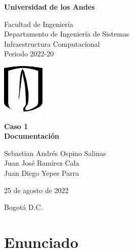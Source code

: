 \documentclass[letterpaper, 11pt]{article}
\begin{document}
\begin{titlepage}
\centering
{\bfseries\LARGE Universidad de los Andes \par}
\vspace{1cm}
{\Large Facultad de Ingeniería \\ Departamento de Ingeniería de Sistemas \\ Infraestructura Computacional \\ Periodo 2022-20\par}
\vspace{2.0cm}
{\includegraphics[width=0.15\textwidth]{imagenes/Uniandes.png}\par}
\vspace{2.0cm}
{\bfseries \LARGE Caso 1\\Documentación\par}
\vspace{2.0cm}
\vfill

\vfill

Sebastian Andrés Ospino Salinas \\ Juan José Ramírez Cala \\ Juan Diego Yepes Parra \par
\vfill
{\Large 25 de agosto de 2022 \par}
{\Large Bogotá D.C. \par}
\end{titlepage}

\tableofcontents
\pagebreak

\section{Enunciado}
\end{document}
